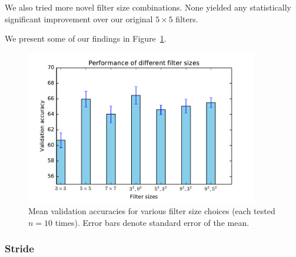 \documentclass{article}
\begin{document}
\begin{multicols}{2}
We also tried more novel filter size combinations.
None yielded any statistically significant improvement
over our original $5\times 5$ filters.

We present some of our findings
in Figure~\ref{fig:filter-size-experiment}.

\begin{figure}[t]
   \centering
   \includegraphics[width=4in]{img/2-5-filter-size-acc.pdf} 
   \caption{Mean validation accuracies for various filter size choices (each tested $n=10$ times).
       Error bars denote standard error of the mean.}
   \label{fig:filter-size-experiment}
\end{figure}



\subsubsection{Stride}


\end{multicols}
\end{document}
